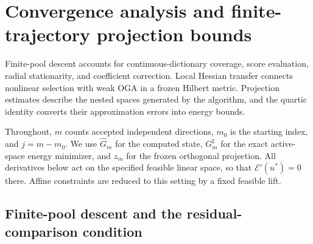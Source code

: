 \documentclass[11pt]{article}
\def\CGAChapterFiveStandalone{1}
\theoremstyle{remark}
\begin{document}
\setcounter{section}{3}
\fi
\providecommand{\cE}{\mathcal E}
\providecommand{\cD}{\mathcal D}
\providecommand{\cP}{\mathcal P}
\providecommand{\cK}{\mathcal K}
\providecommand{\cnorm}[1]{\left\lVert#1\right\rVert}
\providecommand{\cabs}[1]{\left|#1\right|}
\providecommand{\cinner}[2]{\left\langle#1,#2\right\rangle}
\providecommand{\cdd}{\,\mathrm d}
\providecommand{\cR}{\mathbb R}

\ifdefined\CGAChapterFiveStandalone
  \newcommand{\CGAHLDreference}{the finite-pool descent estimates}
  \newcommand{\CGAEnergyMetricReference}{the energy--distance theorem and metric corollary in the main text}
  \newcommand{\CGAEnergyTheoremReference}{the energy--distance theorem in the main text}
\else
  \newcommand{\CGAHLDreference}{Section~\ref{sec:descent}}
  \newcommand{\CGAEnergyMetricReference}{Theorem~\ref{thm:energy-v} and Corollary~\ref{cor:metric-rates}}
  \newcommand{\CGAEnergyTheoremReference}{Theorem~\ref{thm:energy-v}}
\fi

\section{Convergence analysis and finite-trajectory projection bounds}
\label{sec:c5}

Finite-pool descent accounts for continuous-dictionary coverage, score evaluation, radial stationarity, and coefficient correction. Local Hessian transfer connects nonlinear selection with weak OGA in a frozen Hilbert metric. Projection estimates describe the nested spaces generated by the algorithm, and the quartic identity converts their approximation errors into energy bounds.

Throughout, \(m\) counts accepted independent directions, \(m_0\) is the starting index, and \(j=m-m_0\). We use \(\widehat G_m\) for the computed state, \(G_m^\sharp\) for the exact active-space energy minimizer, and \(z_m\) for the frozen orthogonal projection.
All derivatives below act on the specified feasible linear space, so that
$\cE'(u^*)=0$ there. Affine constraints are reduced to this setting by a
fixed feasible lift.

\subsection{Finite-pool descent and the residual-comparison condition}
\label{sec:c5-descent}
\end{document}
